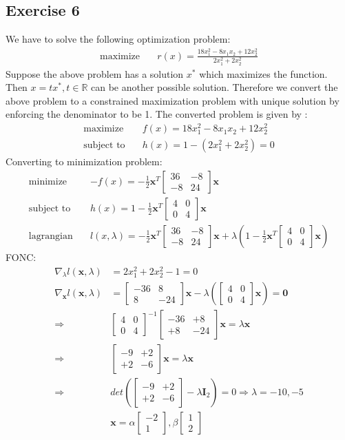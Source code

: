 \documentclass[a4paper,11pt]{article}
\newcommand{\V}[1]{\pmb{#1}}
\newcommand{\mat}[1]{\begin{bmatrix}#1\end{bmatrix}}
\begin{document}
\subsection*{Exercise 6} 
We have to solve the following optimization problem:
\begin{align*}
	\text{maximize} \quad& r(x) = \frac{18x_1^2 - 8x_1x_2 +12x_2^2}{2x_1^2 + 2x_2^2}
\end{align*}
Suppose the above problem has a solution $x^*$ which maximizes the function. Then $x = tx^*, t\in \mathbb{R}$ can be another possible solution. Therefore we convert the above problem to a constrained maximization problem with unique solution by enforcing the denominator to be 1. The converted problem is given by :
\begin{align*}
 \text{maximize} \quad& f(x) = 18x_1^2 - 8x_1x_2 +12x_2^2\\
	\text{subject to} \quad& h(x)= 1 - (2x_1^2 + 2x_2^2) = 0
\end{align*}
Converting to minimization problem:
\begin{align*}
 \text{minimize} \quad& -f(x) = -\frac{1}{2}\V{x}^T\mat{36& -8\\-8& 24}\V{x}\\
 \text{subject to} \quad& h(x)= 1 - \frac{1}{2}\V{x}^T\mat{4&0\\0&4}\V{x}\\
 \text{lagrangian}\quad& l(x,\lambda) = -\frac{1}{2}\V{x}^T\mat{36& -8\\-8& 24}\V{x} + \lambda(1 - \frac{1}{2}\V{x}^T\mat{4&0\\0&4}\V{x})
\end{align*}
FONC:
\begin{align*}
 \nabla_{\lambda} l(\V{x},\lambda)&= 2x_1^2 + 2x_2^2-1 = 0\\
 \nabla_{\V{x}} l(\V{x},\lambda) &= 
 \mat{-36& 8\\8& -24}\V{x} - \lambda(\mat{4&0\\0&4}\V{x})=\V{0}\\
 \Rightarrow& \mat{4&0\\0&4}^{-1}\mat{-36& +8\\+8& -24}\V{x} = \lambda\V{x}\\
 \Rightarrow& \mat{-9& +2\\+2& -6}\V{x} = \lambda\V{x}\\
 \Rightarrow& det(\mat{-9& +2\\+2& -6}-\lambda \V{I}_2) = 0
 \Rightarrow \lambda = -10,-5\\ 
 & \V{x} = \alpha\mat{-2\\1}, \beta\mat{1\\2}\\
\end{align*}
\end{document}
